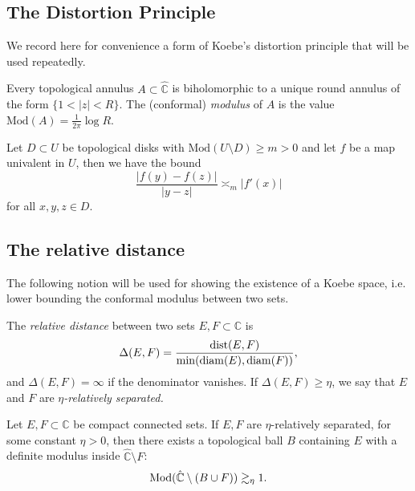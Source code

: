 \subsection{The Distortion Principle}
We record here for convenience a form of Koebe's distortion principle that will be used repeatedly. 

\begin{definition}
	Every topological annulus $A \subset \hat{\mathbb C}$ is biholomorphic to 
	a unique round annulus of the form $\{ 1<|z|<R \}$. 
	The (conformal) \emph{modulus} of $A$ is the value $\mathrm {Mod}(A) = \frac 1{2\pi} \log R$. 


\end{definition}
\begin{theorem}  \label{Koebe}
	Let $D \subset U $ be topological disks with $\mathrm {Mod}(U \setminus D)  \geq m>0$
	 and let $f$ be a map univalent in $U$,
	then we have the bound 
	\begin{equation}
		\frac {|f(y)-f(z)|}{|y-z|} \asymp_m |f'(x)|
	\end{equation}
	for all $x,y,z \in D$.
\end{theorem}

\subsection{The relative distance}

The following notion will be used for showing the existence of a Koebe space, i.e. lower bounding the conformal modulus between two sets.
\begin{definition}
	The \emph{relative distance} between two sets $E,F \subset \mathbb C$ is 
	\begin{equation}
		\Delta(E,F) = \frac{\operatorname{dist}(E,F)}{\min(\operatorname{diam}(E), \operatorname{diam}(F))},	
	\end{equation}
	and $\Delta(E,F) = \infty$ if the denominator vanishes.
	If $\Delta(E,F) \geq \eta$, we say that $E$ and $F$ are 
	\emph{$\eta$-relatively separated.}
\end{definition}

\begin{theorem} \label{thm: rel-dist-bounds-modulus}
	Let $E,F \subset \mathbb C$ be compact connected sets.
	If $E,F$ are $\eta$-relatively separated, for some constant $\eta>0$,
	then there exists a topological ball $B$ containing $E$ with a definite modulus inside $\hat{\mathbb C} \setminus F$:
	\begin{equation}
		\operatorname{Mod} (\hat{\mathbb C} \setminus (B \cup F)) \gtrsim _\eta 1.
	\end{equation}
\end{theorem}

